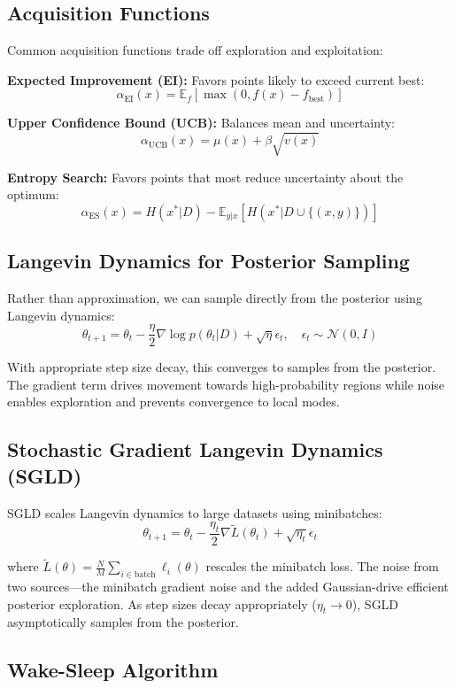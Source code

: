 \documentclass[12pt,a4paper]{article}
\theoremstyle{definition}
\begin{document}
\subsection{Acquisition Functions}

Common acquisition functions trade off exploration and exploitation:

\textbf{Expected Improvement (EI):} Favors points likely to exceed current best:
\[
\alpha_{\mathrm{EI}}(x) = \mathbb{E}_f[\max(0, f(x) - f_{\text{best}})]
\]

\textbf{Upper Confidence Bound (UCB):} Balances mean and uncertainty:
\[
\alpha_{\mathrm{UCB}}(x) = \mu(x) + \beta \sqrt{v(x)}
\]

\textbf{Entropy Search:} Favors points that most reduce uncertainty about the optimum:
\[
\alpha_{\mathrm{ES}}(x) = H(x^*|D) - \mathbb{E}_{y|x}[H(x^* | D \cup \{(x,y)\})]
\]

\subsection{Langevin Dynamics for Posterior Sampling}

Rather than approximation, we can sample directly from the posterior using Langevin dynamics:
\[
\theta_{t+1} = \theta_t - \frac{\eta}{2} \nabla \log p(\theta_t|D) + \sqrt{\eta} \epsilon_t, \quad \epsilon_t \sim \mathcal{N}(0, I)
\]

With appropriate step size decay, this converges to samples from the posterior. The gradient term drives movement towards high-probability regions while noise enables exploration and prevents convergence to local modes.

\subsection{Stochastic Gradient Langevin Dynamics (SGLD)}

SGLD scales Langevin dynamics to large datasets using minibatches:
\[
\theta_{t+1} = \theta_t - \frac{\eta_t}{2} \nabla \tilde{L}(\theta_t) + \sqrt{\eta_t} \epsilon_t
\]

where $\tilde{L}(\theta) = \frac{N}{M} \sum_{i \in \text{batch}} \ell_i(\theta)$ rescales the minibatch loss. The noise from two sources---the minibatch gradient noise and the added Gaussian-drive efficient posterior exploration. As step sizes decay appropriately ($\eta_t \to 0$), SGLD asymptotically samples from the posterior.

\subsection{Wake-Sleep Algorithm}
\end{document}
